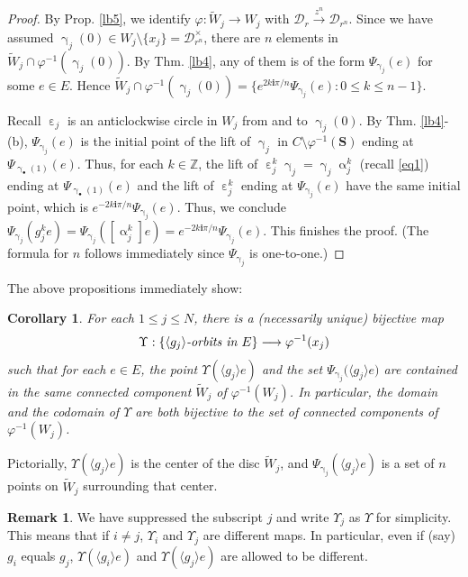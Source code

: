 \documentclass[12pt,a4paper,notitlepage]{article}
\theoremstyle{definition}
\newtheorem{rem}[df]{Remark}
\theoremstyle{plain}
\newtheorem{co}[df]{Corollary}
\newcommand{\mc}{\mathcal}
\newcommand{\wtd}{\widetilde}
\newcommand{\bk}[1]{\langle {#1}\rangle}
\newcommand{\im}{\mathbf{i}}
\newcommand{\blt}{\bullet}
\newcommand{\Zbb}{\mathbb Z}
\newcommand{\Sbf}{\mathbf{S}}
\numberwithin{equation}{subsection}
\begin{document}
\begin{proof}
By Prop. \ref{lb5}, we identify $\varphi:\wtd W_j\rightarrow W_j$ with $\mc D_r\xrightarrow{z^n}\mc D_{r^n}$. Since we have assumed $\upgamma_j(0)\in W_j\setminus\{x_j\}=\mc D_{r^n}^\times$,  there are $n$ elements in $\wtd W_j\cap\varphi^{-1}(\upgamma_j(0))$. By Thm. \ref{lb4}, any of them is of the form $\Psi_{\upgamma_j}(e)$ for some $e\in E$. Hence $\wtd W_j\cap\varphi^{-1}(\upgamma_j(0))=\{e^{2k\im\pi/n}\Psi_{\upgamma_j}(e):0\leq k\leq n-1\}$.

Recall $\upepsilon_j$ is an anticlockwise circle in $W_j$ from and to $\upgamma_j(0)$. By Thm. \ref{lb4}-(b), $\Psi_{\upgamma_j}(e)$ is the initial point of the lift of $\upgamma_j$ in $C\setminus\varphi^{-1}(\Sbf)$ ending at $\Psi_{\upgamma_\blt(1)}(e)$. Thus, for each $k\in\Zbb$, the lift of $\upepsilon_j^k\upgamma_j=\upgamma_j\upalpha_j^k$ (recall \eqref{eq1}) ending at $\Psi_{\upgamma_\blt(1)}(e)$ and the lift of $\upepsilon_j^k$ ending at $\Psi_{\upgamma_j}(e)$ have the same initial point, which is $e^{-2k\im\pi/n}\Psi_{\upgamma_j}(e)$. Thus, we conclude $\Psi_{\upgamma_j}(g_j^ke)=\Psi_{\upgamma_j}([\upalpha_j^k] e)=e^{-2k\im\pi/n}\Psi_{\upgamma_j}(e)$. This finishes the proof. (The formula for $n$ follows immediately since $\Psi_{\upgamma_j}$ is one-to-one.)
\end{proof}

The above propositions immediately show:

\begin{co}\label{lb6}
For each $1\leq j\leq N$, there is a (necessarily unique) bijective map 
\begin{align*}
\Upsilon:\{\bk{g_j}\emph{-orbits in }E\}\longrightarrow \varphi^{-1}(x_j)
\end{align*}
such that for each $e\in E$, the point $\Upsilon(\bk{g_j} e)$    and the set $\Psi_{\upgamma_j}\big(\bk{g_j} e\big)$ are contained in the same connected component $\wtd W_j$ of $\varphi^{-1}(W_j)$. In particular, the domain and the codomain of $\Upsilon$ are both bijective to the set of connected components of $\varphi^{-1}(W_j)$.
\end{co}

Pictorially, $\Upsilon(\bk{g_j}e)$ is the center of the disc $\wtd W_j$, and  $\Psi_{\upgamma_j}(\bk{g_j}e)$ is a set of $n$ points on $\wtd W_j$ surrounding that center.

\begin{rem}
We have suppressed the subscript $j$ and write $\Upsilon_j$ as $\Upsilon$ for simplicity. This means that if $i\neq j$,  $\Upsilon_i$ and $\Upsilon_j$ are different maps. In particular, even if (say) $g_i$ equals $g_j$, $\Upsilon(\bk{g_i}e)$ and $\Upsilon(\bk{g_j}e)$ are allowed to be different.	
\end{rem}
\end{document}
